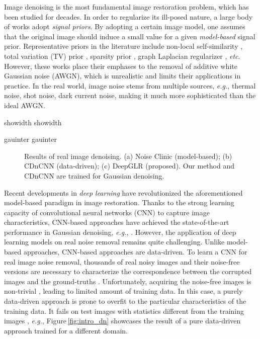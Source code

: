 \documentclass[10pt,twocolumn,letterpaper]{article}
\newcommand{\deflen}[2]{%
    \expandafter\newlength\csname #1\endcsname
    \expandafter\setlength\csname #1\endcsname{#2}%
}
\begin{document}
Image denoising is the most fundamental image restoration problem, which has been studied for decades. 
In order to regularize its ill-posed nature, a large body of works adopt \emph{signal priors}. 
By adopting a certain image model, one assumes that the original image should induce a small value for a given \emph{model-based} signal prior.
Representative priors in the literature include non-local self-similarity \cite{buades2005non}, total variation (TV) prior \cite{rudin1992nonlinear}, sparsity prior \cite{elad2006image}, graph Laplacian regularizer \cite{pang2017graph}, {\it etc}.
However, these works place their emphases to the removal of additive white Gaussian noise (AWGN), which is unrealistic and limits their applications in practice.
In the real world, image noise stems from multiple sources, {\it e.g.}, thermal noise, shot noise, dark current noise, making it much more sophisticated than the ideal AWGN.

\deflen{showidth}{75pt}
\deflen{gauinter}{0pt}
\begin{figure}[t]
\centering
        \hspace{\gauinter}
        \hspace{\gauinter}
 \caption{Results of real image denoising. (a) Noise Clinic (model-based); (b) CDnCNN (data-driven); (c) DeepGLR (proposed). Our method and CDnCNN are trained for Gaussian denoising.}
 \label{fig:intro}
\end{figure}

Recent developments in \emph{deep learning} have revolutionized the aforementioned model-based paradigm in image restoration. 
Thanks to the strong learning capacity of convolutional neural networks (CNN) to capture image characteristics, CNN-based approaches have achieved the state-of-the-art performance in Gaussian denoising, {\it e.g.}, \cite{zhang2017beyond,vemulapalli2016deep,tai2017memnet}. 
However, the application of deep learning models on real noise removal remains quite challenging. 
Unlike model-based approaches, CNN-based approaches are data-driven. 
To learn a CNN for real image noise removal, thousands of real noisy images and their noise-free versions are necessary to characterize the correspondence between the corrupted images and the ground-truths \cite{zhu2016noise}.
Unfortunately, acquiring the noise-free images is non-trivial \cite{xu2017multi,chen2018learning}, leading to limited amount of training data. 
In this case, a purely data-driven approach is prone to overfit to the particular characteristics of the training data. 
It fails on test images with statistics different from the training images \cite{mccann2017convolutional}, {\it e.g.}, Figure\,\ref{fig:intro_dn} showcases the result of a pure data-driven approach trained for a different domain.
	
\end{document}
